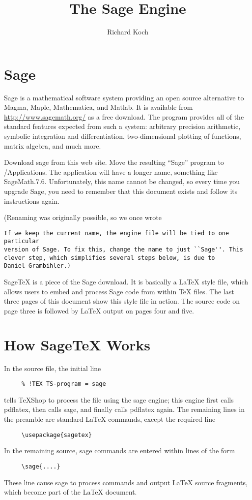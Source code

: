 \documentclass[11pt, oneside]{amsart}
\title{The Sage Engine}
\author{Richard Koch}
\begin{document}
\maketitle
\vspace{-.3in}
\section{Sage}
Sage is a mathematical software system providing an open source alternative to Magma, Maple, Mathematica, and Matlab. It is available from 
\url{http://www.sagemath.org/} as a free download. The program provides all of the standard features expected from such a system: arbitrary precision arithmetic, symbolic integration and differentiation, two-dimensional plotting of functions, matrix algebra, and much more.

Download sage from this web site. Move the resulting ``Sage'' program to /Applications. The
application will have a longer name, something like SageMath.7.6. Unfortunately, this name cannot be changed, so every time you upgrade Sage, you need to remember that this document exists and follow its instructions again.

(Renaming was originally possible, so we once wrote
\begin{verbatim}
If we keep the current name, the engine file will be tied to one particular
version of Sage. To fix this, change the name to just ``Sage''. This 
clever step, which simplifies several steps below, is due to 
Daniel Grambihler.)
\end{verbatim}


SageTeX is a piece of the Sage download. It is basically a LaTeX style file, which  allows users to embed and process Sage code from within TeX files. The last three pages of this document show this style file in action. The source code on page three is followed by LaTeX output on pages four and five.

\section{How SageTeX Works}

 In the source file, the initial line
\begin{verbatim}
     % !TEX TS-program = sage
\end{verbatim}
tells TeXShop to process the file using the sage engine; this engine first calls pdflatex, then calls sage, and finally calls pdflatex again.
The remaining lines in the preamble are standard LaTeX commands, except the required line
\begin{verbatim}
     \usepackage{sagetex}
\end{verbatim}
In the remaining source, sage commands are entered within lines of the form
\begin{verbatim}
     \sage{....}
\end{verbatim}
These line cause sage to process commands and output LaTeX source fragments, which become part of the LaTeX document.
\end{document}
